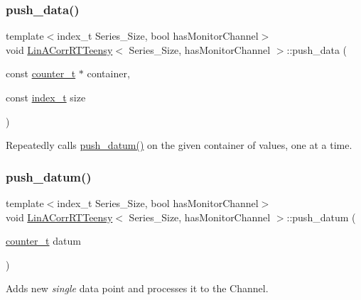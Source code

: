 \subsubsection{\texorpdfstring{push\+\_\+data()}{push\_data()}}
{\footnotesize\ttfamily template$<$index\+\_\+t Series\+\_\+\+Size, bool has\+Monitor\+Channel$>$ \\
void \hyperlink{classLinACorrRTTeensy}{Lin\+A\+Corr\+R\+T\+Teensy}$<$ Series\+\_\+\+Size, has\+Monitor\+Channel $>$\+::push\+\_\+data (\begin{DoxyParamCaption}\item[{const \hyperlink{types_8hpp_a22f279793847eba127de149437848c48}{counter\+\_\+t} $\ast$}]{container,  }\item[{const \hyperlink{types_8hpp_a7c40bb931c31595ed6308605f4537447}{index\+\_\+t}}]{size }\end{DoxyParamCaption})\hspace{0.3cm}{\ttfamily [inline]}}



Repeatedly calls {\ttfamily \hyperlink{classLinACorrRTTeensy_aacc634aad2252efbb6ee3a4c2ac422dc}{push\+\_\+datum()}} on the given container of values, one at a time. 

\mbox{\label{classLinACorrRTTeensy_aacc634aad2252efbb6ee3a4c2ac422dc}} 
\subsubsection{\texorpdfstring{push\+\_\+datum()}{push\_datum()}}
{\footnotesize\ttfamily template$<$index\+\_\+t Series\+\_\+\+Size, bool has\+Monitor\+Channel$>$ \\
void \hyperlink{classLinACorrRTTeensy}{Lin\+A\+Corr\+R\+T\+Teensy}$<$ Series\+\_\+\+Size, has\+Monitor\+Channel $>$\+::push\+\_\+datum (\begin{DoxyParamCaption}\item[{\hyperlink{types_8hpp_a22f279793847eba127de149437848c48}{counter\+\_\+t}}]{datum }\end{DoxyParamCaption})\hspace{0.3cm}{\ttfamily [inline]}}



Adds new {\itshape single} data point and processes it to the {\ttfamily Channel}. 



